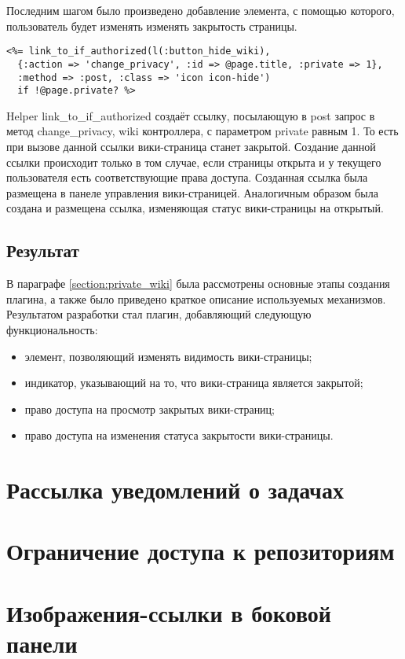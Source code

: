 Последним шагом было произведено добавление элемента, с помощью которого,
пользователь будет изменять изменять закрытость страницы.
\small{\begin{lstlisting}
<%= link_to_if_authorized(l(:button_hide_wiki), 
  {:action => 'change_privacy', :id => @page.title, :private => 1}, 
  :method => :post, :class => 'icon icon-hide') 
  if !@page.private? %>
\end{lstlisting}}
Helper link\_to\_if\_authorized создаёт ссылку, посылающую в post запрос в
метод change\_privacy, wiki контроллера, с параметром private равным 1. То есть при
вызове данной ссылки вики-страница станет закрытой. Создание данной ссылки
происходит только в том случае, если страницы открыта и у текущего пользователя
есть соответствующие права доступа. Созданная ссылка была размещена в панеле
управления вики-страницей. Аналогичным образом была создана и размещена
ссылка, изменяющая статус вики-страницы на открытый.

\subsection{Результат}
В параграфе \ref{section:private_wiki} была рассмотрены основные этапы создания
плагина, а также было приведено краткое описание используемых механизмов.
Результатом разработки стал плагин, добавляющий следующую функциональность:
\begin{itemize}
  \item элемент, позволяющий изменять видимость вики-страницы;
  \item индикатор, указывающий на то, что вики-страница является закрытой;
  \item право доступа на просмотр закрытых вики-страниц;
  \item право доступа на изменения статуса закрытости вики-страницы.
\end{itemize}


\section{Рассылка уведомлений о задачах}

\section{Ограничение доступа к репозиториям}

\section{Изображения-ссылки в боковой панели}


